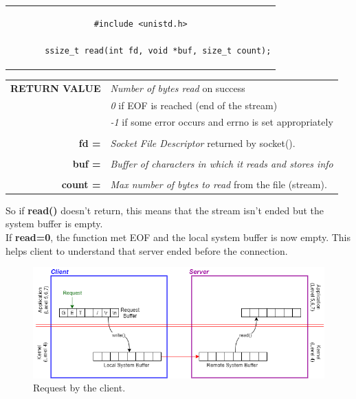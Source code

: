 \begin{center}
\begin{tabular}{c}
\begin{lstlisting}[linewidth=280pt, basicstyle=\footnotesize\sffamily,]
#include <unistd.h>

       ssize_t read(int fd, void *buf, size_t count);
\end{lstlisting}
\end{tabular}
\end{center}

\begin{table}[h]
\centering
\begin{tabular}{rcl}
\textbf{RETURN VALUE} & \multicolumn{2}{l}{\textit{Number of bytes read} on success}\\
{} & \multicolumn{2}{l}{\textit{0} if EOF is reached (end of the stream)}\\
{} & \multicolumn{2}{l}{\textit{-1} if some error occurs and errno is set appropriately}\\
& & \\
\textbf{fd =} & \multicolumn{2}{l}{\textit{Socket File Descriptor} returned by socket().}\\
& &\\
\textbf{buf =} & \multicolumn{2}{l}{\textit{Buffer of characters in which it reads and stores info}}\\
& & \\
\textbf{count =} & \multicolumn{2}{l}{\textit{Max number of bytes to read} from the file (stream).}
\end{tabular}
\end{table}
So if \textbf{read()} doesn't return, this means that the stream isn't ended but the system buffer is empty.\\
If \textbf{read=0}, the function met EOF and the local system buffer is now empty. This helps client to understand that server ended before the connection.

\begin{figure}[h]
\centering
\includegraphics[scale=0.6]{Images/NetworkC/read_write1}\caption{\footnotesize{Request by the client.}}\label{rw1}
\end{figure}

